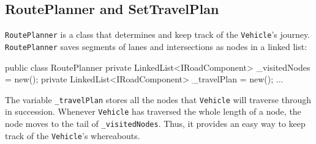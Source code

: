 \subsection{RoutePlanner and SetTravelPlan}
\verb|RoutePlanner|  is a class that determines and keep track of the \verb|Vehicle|'s journey. \verb|RoutePlanner| saves segments of lanes and intersections as nodes in a linked list:
\begin{csharp}
public class RoutePlanner
{
	private LinkedList<IRoadComponent> _visitedNodes = new();
	private LinkedList<IRoadComponent> _travelPlan = new();
	...
}
\end{csharp}
The variable \verb|_travelPlan| stores all the nodes that \verb|Vehicle| will traverse through in succession. Whenever \verb|Vehicle| has traversed the whole length of a node, the node moves to the tail of \verb|_visitedNodes|. Thus, it provides an easy way to keep track of the \verb|Vehicle|'s whereabouts.

